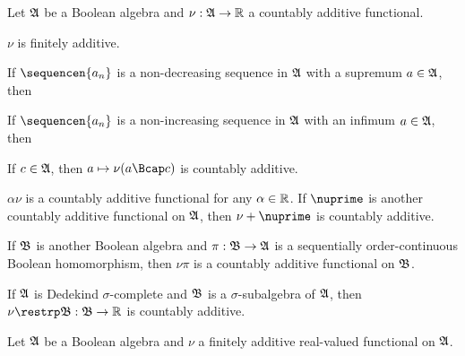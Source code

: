  Let $\frak A$ be a Boolean algebra
and $\nu:\frak A\to\Bbb R$ a countably additive functional.

 $\nu$ is finitely additive.   

 If $\sequencen{a_n}$ is a non-decreasing
sequence in $\frak A$ with a supremum $a\in\frak A$, then


 If $\sequencen{a_n}$ is a non-increasing
sequence in $\frak A$ with an infimum $a\in\frak A$,
then


 If $c\in\frak A$, then $a\mapsto\nu(a\Bcap c)$
is countably additive.   

 $\alpha\nu$ is a countably additive functional
for any
$\alpha\in\Bbb R$.   If $\nuprime$ is another countably additive functional
on $\frak A$, then $\nu+\nuprime$ is countably additive.

 If $\frak B$ is another Boolean algebra and
$\pi:\frak B\to\frak A$ is a sequentially order-continuous Boolean
homomorphism, then $\nu\pi$ is a countably additive functional on $\frak
B$.   

 If $\frak A$ is Dedekind $\sigma$-complete and
$\frak B$ is a $\sigma$-subalgebra of $\frak A$, then
$\nu\restrp\frak B:\frak B\to\Bbb R$ is countably additive.


Let $\frak A$ be a Boolean algebra and $\nu$ a
finitely additive real-valued functional on $\frak A$.


